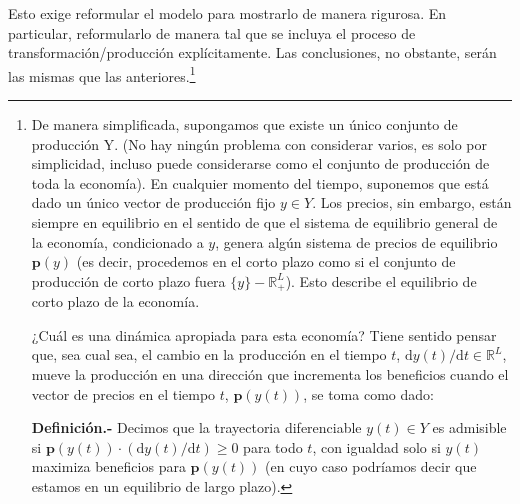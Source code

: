\documentclass[10pt,a4paper]{article}
\begin{document}
Esto exige reformular el modelo para mostrarlo de manera rigurosa. En particular, reformularlo de manera tal que se incluya el proceso de transformación/producción explícitamente. Las conclusiones, no obstante, serán las mismas que las anteriores.\footnote{%
    De manera simplificada, supongamos que existe un único conjunto de producción Y. (No hay ningún problema con considerar varios, es solo por simplicidad, incluso puede considerarse como el conjunto de producción de toda la economía). En cualquier momento del tiempo, suponemos que está dado un único vector de producción fijo $y\in Y$. Los precios, sin embargo, están siempre en equilibrio en el sentido de que el sistema de equilibrio general de la economía, condicionado a $y$, genera algún sistema de precios de equilibrio $\mathbf p(y)$ (es decir, procedemos en el corto plazo como si el conjunto de producción de corto plazo fuera $\{y\}-\mathbb R^L_+$). Esto describe el equilibrio de corto plazo de la economía.

¿Cuál es una dinámica apropiada para esta economía? Tiene sentido pensar que, sea cual sea, el cambio en la producción en el tiempo $t$, $\mathrm dy(t)/\mathrm dt\in \mathbb{R}^L$, mueve la producción en una dirección que incrementa los beneficios cuando el vector de precios en el tiempo $t$, $\mathbf p(y(t))$, se toma como dado:

\textbf{Definición.-} Decimos que la trayectoria diferenciable $y(t)\in Y$ es admisible si $\mathbf p(y(t))\cdot (\mathrm dy(t)/\mathrm dt)\ge 0$ para todo $t$, con igualdad solo si $y(t)$ maximiza beneficios para $\mathbf p(y(t))$ (en cuyo caso podríamos decir que estamos en un equilibrio de largo plazo).

}
\end{document}
